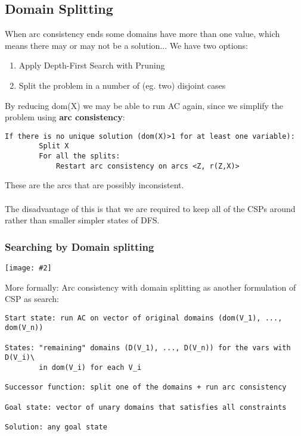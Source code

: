 \documentclass{article}
\theoremstyle{definition}
\newcommand{\centerfig}[2]{\begin{center}\texttt{[image: \#2]}\end{center}}
\begin{document}
\subsection*{Domain Splitting}
When arc consistency ends some domains have more than one value, which means there may or may not be a solution... We have two options:
\begin{enumerate}[label = \Alph* )]
	\item Apply Depth-First Search with Pruning
	\item Split the problem in a number of (eg. two) disjoint cases
\end{enumerate}
By reducing dom(X) we may be able to run AC again, since we simplify the problem using \textbf{arc consistency}:
\begin{lstlisting}[tabsize=3]
	If there is no unique solution (dom(X)>1 for at least one variable):
		Split X
		For all the splits:
			Restart arc consistency on arcs <Z, r(Z,X)>
\end{lstlisting}
These are the arcs that are possibly inconsistent.  \\ \\
The disadvantage of this is that we are required to keep all of the CSPs around rather than smaller simpler states of DFS. 
\subsubsection*{Searching by Domain splitting}
\centerfig{0.75}{domainsplitting}
More formally: Arc consistency with domain splitting as another formulation of CSP as search:

\begin{lstlisting}[tabsize = 3]
Start state: run AC on vector of original domains (dom(V_1), ..., dom(V_n))

States: "remaining" domains (D(V_1), ..., D(V_n)) for the vars with D(V_i)\
		in dom(V_i) for each V_i
		
Successor function: split one of the domains + run arc consistency

Goal state: vector of unary domains that satisfies all constraints

Solution: any goal state
\end{lstlisting}
\end{document}
